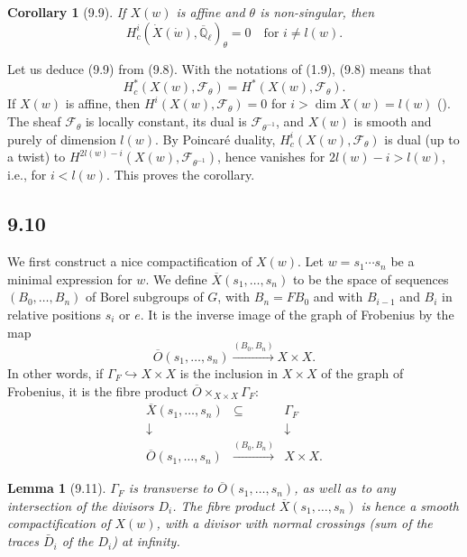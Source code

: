 \documentclass[11pt]{amsart}
\theoremstyle{plain}
\newtheorem{lemma}[theorem]{Lemma}
\newtheorem{corollary}[theorem]{Corollary}
\theoremstyle{remark}
\begin{document}
\begin{corollary}[9.9]
If $X(w)$ is affine and $\theta$ is non-singular, then
\[
H_c^i(\dot{X}(\dot{w}), \overline{\mathbb{Q}}_\ell)_\theta = 0 \quad \text{for } i \neq l(w).
\]
\end{corollary}

Let us deduce (9.9) from (9.8). With the notations of (1.9), (9.8) means that
\begin{equation}\label{eq:9.9.1}
H_c^*(X(w), \mathcal{F}_\theta) = H^*(X(w), \mathcal{F}_\theta).
\end{equation}
If $X(w)$ is affine, then $H^i(X(w), \mathcal{F}_\theta) = 0$ for $i > \dim X(w) = l(w)$ (\cite[XIV, 3.2]{SGA4}). The sheaf $\mathcal{F}_\theta$ is locally constant, its dual is $\mathcal{F}_{\theta^{-1}}$, and $X(w)$ is smooth and purely of dimension $l(w)$. By Poincar\'e duality, $H_c^i(X(w), \mathcal{F}_\theta)$ is dual (up to a twist) to $H^{2l(w)-i}(X(w), \mathcal{F}_{\theta^{-1}})$, hence vanishes for $2l(w) - i > l(w)$, i.e., for $i < l(w)$. This proves the corollary.

\subsection{9.10} We first construct a nice compactification of $X(w)$. Let $w = s_1 \cdots s_n$ be a minimal expression for $w$. We define $\overline{X}(s_1, \dots, s_n)$ to be the space of sequences $(B_0, \dots, B_n)$ of Borel subgroups of $G$, with $B_n = FB_0$ and with $B_{i-1}$ and $B_i$ in relative positions $s_i$ or $e$. It is the inverse image of the graph of Frobenius by the map
\[
\overline{O}(s_1, \dots, s_n) \xrightarrow{(B_0, B_n)} X \times X.
\]
In other words, if $\Gamma_F \hookrightarrow X \times X$ is the inclusion in $X \times X$ of the graph of Frobenius, it is the fibre product $\overline{O} \times_{X \times X} \Gamma_F$:
\[
\begin{array}{ccc}
\overline{X}(s_1, \dots, s_n) & \subseteq & \Gamma_F \\
\downarrow & & \downarrow \\
\overline{O}(s_1, \dots, s_n) & \xrightarrow{(B_0, B_n)} & X \times X.
\end{array}
\]

\begin{lemma}[9.11]
$\Gamma_F$ is transverse to $\overline{O}(s_1, \dots, s_n)$, as well as to any intersection of the divisors $D_i$. The fibre product $\overline{X}(s_1, \dots, s_n)$ is hence a smooth compactification of $X(w)$, with a divisor with normal crossings (sum of the traces $\bar{D}_i$ of the $D_i$) at infinity.
\end{lemma}
\end{document}
